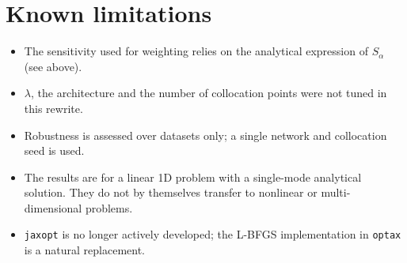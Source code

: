 \documentclass[10pt]{article}
\newcommand{\code}[1]{\texttt{#1}}
\begin{document}
\section{Known limitations}
\begin{itemize}
\item The sensitivity used for weighting relies on the analytical expression of $S_\alpha$ (see above).
\item $\lambda$, the architecture and the number of collocation points were not tuned in this rewrite.
\item Robustness is assessed over datasets only; a single network and collocation seed is used.
\item The results are for a linear 1D problem with a single-mode analytical solution. They do not by themselves transfer to nonlinear or multi-dimensional problems.
\item \code{jaxopt} is no longer actively developed; the L-BFGS implementation in \code{optax} is a natural replacement.
\end{itemize}
\end{document}
